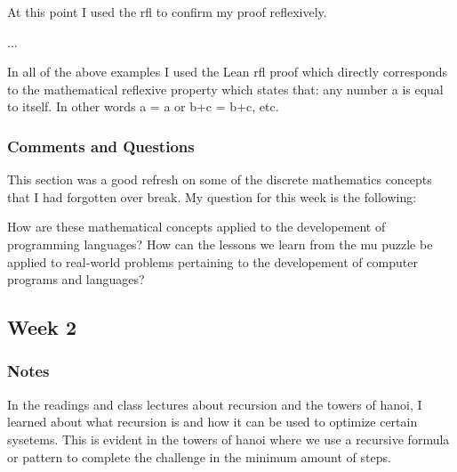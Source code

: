 \documentclass{article}
\theoremstyle{theorem}
\theoremstyle{definition}
\theoremstyle{remark}
\begin{document}
At this point I used the rfl to confirm my proof reflexively.

...

In all of the above examples I used the Lean rfl proof which directly corresponds to the mathematical reflexive property which states that:
any number a is equal to itself. In other words a = a or b+c = b+c, etc.


%
%

\subsubsection*{Comments and Questions}

This section was a good refresh on some of the discrete mathematics concepts that I had forgotten over break. My question for this week is the following:

How are these mathematical concepts applied to the developement of programming languages? How can the lessons we learn from the mu puzzle be applied to real-world problems pertaining to the developement of computer programs and languages?


\subsection{Week 2}



\subsubsection*{Notes}

In the readings and class lectures about recursion and the towers of hanoi, I learned about what recursion is and how it can be used to optimize certain sysetems. This is evident in the towers of hanoi where we use a recursive formula or pattern to complete the challenge in the minimum amount of steps.
\end{document}

